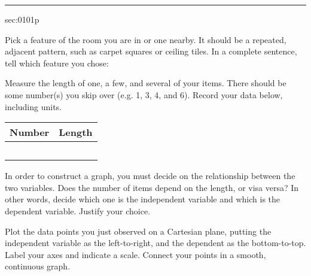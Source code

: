 \renewcommand{\columnseprule}{1.5pt}
\begin{multicols*}{2}
\rule[0.5\baselineskip]{0.5\textwidth}{1pt}
\noindent
{}\label{sec:0101p}
\begin{exercises}{sec:0101p}

\lab{} Pick a feature of the room you are in or one nearby.  It should be a repeated, adjacent pattern,
such as carpet squares or ceiling tiles.  In a complete sentence, tell which feature you chose:

\vspace{2cm}
\lab{} Measure the length of one, a few, and several of your items.  There should be some number(s) you
skip over (e.g. 1, 3, 4, and 6).  Record your data below, including units.

\begin{center}%
\begin{tabular}{ c | p{3cm}  }
  \textbf{Number} & \textbf{Length} \\ 
  \hline \hline 
  &  \\ 
  \hline
  &  \\ 
  \hline
  &  \\ 
  \hline
  &  \\ 
  \hline
  &  \\ 
  \hline
\end{tabular}%
\end{center}%
\noindent
\lab In order to construct a graph, you must
decide on the relationship between the two variables.  Does the number of items depend on
the length, or visa versa?  In other words, decide which one is the \gls{independent variable} and which
is the \gls{dependent variable}.  Justify your choice.

\vspace{2cm}
\noindent
\lab{} Plot the data points you just observed on a \gls{Cartesian plane}, putting
the independent variable as the left-to-right, and the dependent as the bottom-to-top.
Label your axes and indicate a scale.
Connect your points in a smooth, continuous graph.

\noindent
{}

\vspace{1cm}


\end{exercises}
\end{multicols*}
